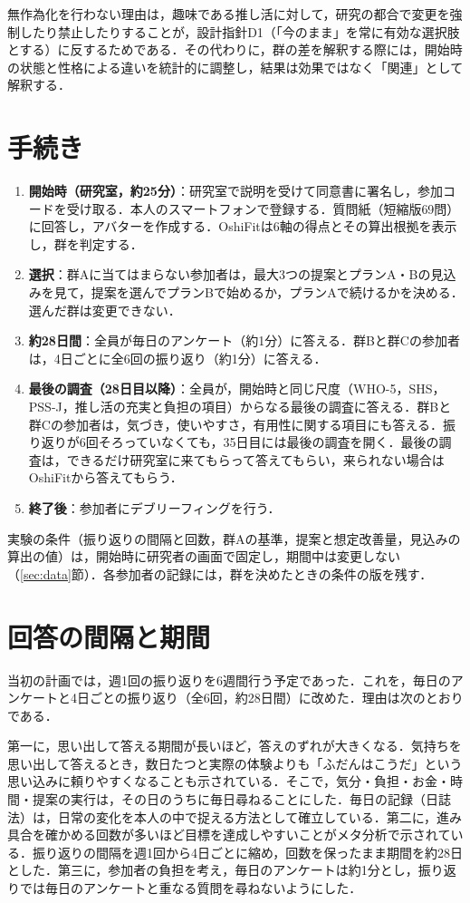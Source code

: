 無作為化を行わない理由は，趣味である推し活に対して，研究の都合で変更を強制したり禁止したりすることが，設計指針D1（「今のまま」を常に有効な選択肢とする）に反するためである．その代わりに，群の差を解釈する際には，開始時の状態と性格による違いを統計的に調整し，結果は効果ではなく「関連」として解釈する．

\section{手続き}
\begin{enumerate}
\item \textbf{開始時（研究室，約25分）}：研究室で説明を受けて同意書に署名し，参加コードを受け取る．本人のスマートフォンで登録する．質問紙（短縮版69問）に回答し，アバターを作成する．OshiFitは6軸の得点とその算出根拠を表示し，群を判定する．
\item \textbf{選択}：群Aに当てはまらない参加者は，最大3つの提案とプランA・Bの見込みを見て，提案を選んでプランBで始めるか，プランAで続けるかを決める．選んだ群は変更できない．
\item \textbf{約28日間}：全員が毎日のアンケート（約1分）に答える．群Bと群Cの参加者は，4日ごとに全6回の振り返り（約1分）に答える．
\item \textbf{最後の調査（28日目以降）}：全員が，開始時と同じ尺度（WHO-5，SHS，PSS-J，推し活の充実と負担の項目）からなる最後の調査に答える．群Bと群Cの参加者は，気づき，使いやすさ，有用性に関する項目にも答える．振り返りが6回そろっていなくても，35日目には最後の調査を開く．最後の調査は，できるだけ研究室に来てもらって答えてもらい，来られない場合はOshiFitから答えてもらう．
\item \textbf{終了後}：参加者にデブリーフィングを行う．
\end{enumerate}

実験の条件（振り返りの間隔と回数，群Aの基準，提案と想定改善量，見込みの算出の値）は，開始時に研究者の画面で固定し，期間中は変更しない（\ref{sec:data}節）．各参加者の記録には，群を決めたときの条件の版を残す．

\section{回答の間隔と期間}
当初の計画では，週1回の振り返りを6週間行う予定であった．これを，毎日のアンケートと4日ごとの振り返り（全6回，約28日間）に改めた．理由は次のとおりである．

第一に，思い出して答える期間が長いほど，答えのずれが大きくなる\cite{stull2009}．気持ちを思い出して答えるとき，数日たつと実際の体験よりも「ふだんはこうだ」という思い込みに頼りやすくなることも示されている\cite{robinson2002}．そこで，気分・負担・お金・時間・提案の実行は，その日のうちに毎日尋ねることにした．毎日の記録（日誌法）は，日常の変化を本人の中で捉える方法として確立している\cite{bolger2003}．第二に，進み具合を確かめる回数が多いほど目標を達成しやすいことがメタ分析で示されている\cite{harkin2016}．振り返りの間隔を週1回から4日ごとに縮め，回数を保ったまま期間を約28日とした．第三に，参加者の負担を考え，毎日のアンケートは約1分とし，振り返りでは毎日のアンケートと重なる質問を尋ねないようにした．


